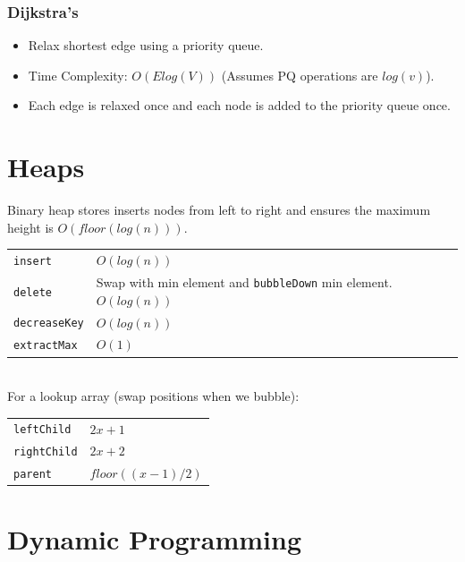 \documentclass[10pt,landscape,a4paper]{article}
\begin{document}
\begin{multicols*}{4}
\subsubsection{Dijkstra's}
\begin{itemize}
    \item Relax shortest edge using a priority queue.
    \item Time Complexity: $O(Elog(V))$ (Assumes PQ operations are $log(v)$).
    \item Each edge is relaxed once and each node is added to the priority queue once.
\end{itemize}


\section{Heaps}
Binary heap stores inserts nodes from left to right and ensures the maximum height is $O(floor(log(n)))$. \\
\begin{tabular}{p{2cm} p{4cm}}
   \verb!insert! & $O(log(n))$ \\
   \verb!delete! & Swap with min element and \texttt{bubbleDown} min element. $O(log(n))$ \\
   \verb!decreaseKey! & $O(log(n))$ \\
   \verb!extractMax!    & $O(1)$ \\
\end{tabular}\\
For a lookup array (swap positions when we bubble):
\begin{tabular}{p{2cm} p{4cm}}
    \verb!leftChild!    &   $2x+1$ \\
    \verb!rightChild!   &   $2x+2$  \\
    \verb!parent!       &   $floor((x-1)/2)$ 
\end{tabular}




\section{Dynamic Programming}
\end{multicols*}
\end{document}
